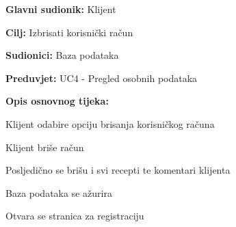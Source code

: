 					\noindent {}
					\begin{packed_item}
	
						\item \textbf{Glavni sudionik: } Klijent
						\item  \textbf{Cilj:} Izbrisati korisnički račun
						\item  \textbf{Sudionici:} Baza podataka
						\item  \textbf{Preduvjet:} UC4 - Pregled osobnih podataka
						\item  \textbf{Opis osnovnog tijeka:}
						
						\item[] \begin{packed_enum}
	
							\item Klijent odabire opciju brisanja korisničkog računa
							\item Klijent briše račun
							\item Posljedično se brišu i svi recepti te komentari klijenta
							\item Baza podataka se ažurira
							\item Otvara se stranica za registraciju
						
						\end{packed_enum}
					\end{packed_item}


